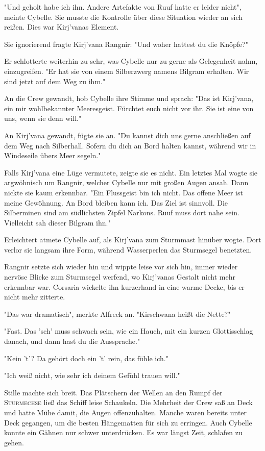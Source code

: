 "Und geholt habe ich ihn. Andere Artefakte von Ruuf hatte er leider nicht", meinte Cybelle. Sie musste die Kontrolle über diese Situation wieder an sich reißen. Dies war Kirj'vanas Element.

Sie ignorierend fragte Kirj'vana Rangnir: "Und woher hattest du die Knöpfe?"

Er schlotterte weiterhin zu sehr, was Cybelle nur zu gerne als Gelegenheit nahm, einzugreifen. "Er hat sie von einem Silberzwerg namens Bilgram erhalten. Wir sind jetzt auf dem Weg zu ihm."

An die Crew gewandt, hob Cybelle ihre Stimme und sprach: "Das ist Kirj'vana, ein mir wohlbekannter Meeresgeist. Fürchtet euch nicht vor ihr. Sie ist eine von uns, wenn sie denn will."

An Kirj'vana gewandt, fügte sie an. "Du kannst dich uns gerne anschließen auf dem Weg nach Silberhall. Sofern du dich an Bord halten kannst, während wir in Windeseile übers Meer segeln."

Falls Kirj'vana eine Lüge vermutete, zeigte sie es nicht. Ein letztes Mal wogte sie argwöhnisch um Rangnir, welcher Cybelle nur mit großen Augen ansah. Dann nickte sie kaum erkennbar. "Ein Flussgeist bin ich nicht. Das offene Meer ist meine Gewöhnung. An Bord bleiben kann ich. Das Ziel ist sinnvoll. Die Silberminen sind am südlichsten Zipfel Narkons. Ruuf muss dort nahe sein. Vielleicht sah dieser Bilgram ihn."

Erleichtert atmete Cybelle auf, als Kirj'vana zum Sturmmast hinüber wogte. Dort verlor sie langsam ihre Form, während Wasserperlen das Sturmsegel benetzten.

Rangnir setzte sich wieder hin und wippte leise vor sich hin, immer wieder nervöse Blicke zum Sturmsegel werfend, wo Kirj'vanas Gestalt nicht mehr erkennbar war. Corsaria wickelte ihn kurzerhand in eine warme Decke, bis er nicht mehr zitterte. 

"Das war dramatisch", merkte Alfreck an. "Kirschwana heißt die Nette?"

"Fast. Das 'sch' muss schwach sein, wie ein Hauch, mit ein kurzen Glottisschlag danach, und dann hast du die Aussprache."

"Kein 't'? Da gehört doch ein 't' rein, das fühle ich." 

"Ich weiß nicht, wie sehr ich deinem Gefühl trauen will."

Stille machte sich breit. Das Plätschern der Wellen an den Rumpf der \textsc{Sturmechse} ließ das Schiff leise Schaukeln. Die Mehrheit der Crew saß an Deck und hatte Mühe damit, die Augen offenzuhalten. Manche waren bereits unter Deck gegangen, um die besten Hängematten für sich zu erringen. Auch Cybelle konnte ein Gähnen nur schwer unterdrücken. Es war längst Zeit, schlafen zu gehen.

